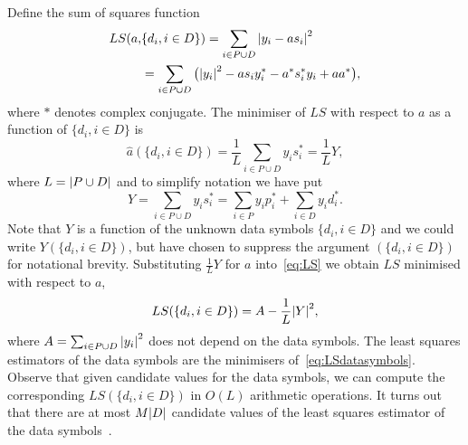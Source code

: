 \documentclass[journal]{IEEEtran}
\begin{document}
Define the sum of squares function
\begin{align}
LS(a, &\{d_i, i \in D\}) = \sum_{i \in P \cup D} {\left\vert  y_i - a s_i  \right\vert}^2 \nonumber \\
&= \sum_{i \in P \cup D} \big( {\left\vert y_i \right\vert}^2 - a s_i y_i^* - a^* s_i^* y_i + aa^* \big), \label{eq:LS}
\end{align}
where $*$ denotes complex conjugate.  The minimiser of $LS$ with respect to $a$ as a function of $\{d_i, i \in D\}$ is
\begin{equation}\label{eq:hata}
\hat{a}(\{d_i, i \in D\}) = \frac{1}{L} \sum_{i \in P \cup D} y_i s_i^* = \frac{1}{L} Y,
\end{equation}
where $L = {\left\vert P \cup D \right\vert}$ and to simplify notation we have put 
\[
Y = \sum_{i \in P \cup D} y_i s_i^* = \sum_{i \in P } y_i p_i^* + \sum_{i \in D } y_i d_i^*.
\]  
Note that $Y$ is a function of the unknown data symbols $\{ d_i, i \in D\}$ and we could write $Y(\{ d_i, i \in D\})$, but have chosen to suppress the argument $(\{ d_i, i \in D\})$ for notational brevity.  Substituting $\frac{1}{L}Y$ for $a$ into~\eqref{eq:LS} we obtain $LS$ minimised with respect to $a$,
\begin{equation}\label{eq:LSdatasymbols}
LS(\{d_i, i \in D\}) = A - \frac{1}{L}{\left\vert Y \right\vert}^2,
\end{equation}
where $A = \sum_{i \in P \cup D}{\left\vert y_i \right\vert}^2$ does not depend on the data symbols.  The least squares estimators of the data symbols are the minimisers of~\eqref{eq:LSdatasymbols}.  Observe that given candidate values for the data symbols, we can compute the corresponding $LS(\{d_i, i \in D\})$ in $O(L)$ arithmetic operations.  It turns out that there are at most $M{\left\vert D \right\vert}$ candidate values of the least squares estimator of the data symbols~\cite{Sweldens2001,Mackenthun1994}.  %
\end{document}
